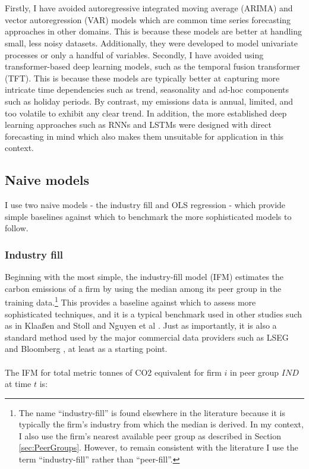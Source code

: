 \documentclass[12pt,twoside]{report}
\begin{document}
\\\\
Firstly, I have avoided autoregressive integrated moving average (ARIMA) and vector autoregression (VAR) models which are common time series forecasting approaches in other domains. This is because these models are better at handling small, less noisy datasets. Additionally, they were developed to model univariate processes or only a handful of variables. Secondly, I have avoided using transformer-based deep learning models, such as the temporal fusion transformer (TFT). This is because these models are typically better at capturing more intricate time dependencies such as trend, seasonality and ad-hoc components such as holiday periods. By contrast, my emissions data is annual, limited, and too volatile to exhibit any clear trend. In addition, the more established deep learning approaches such as RNNs and LSTMs were designed with direct forecasting in mind which also makes them unsuitable for application in this context. 

\subsection{Naive models}

I use two naive models - the industry fill and OLS regression - which provide simple baselines against which to benchmark the more sophisticated models to follow. 

\subsubsection{Industry fill}

Beginning with the most simple, the industry-fill model (IFM) estimates the carbon emissions of a firm by using the median among its peer group in the training data.\footnote{The name ``industry-fill'' is found elsewhere in the literature because it is typically the firm's industry from which the median is derived. In my context, I also use the firm's nearest available peer group as described in Section \ref{sec:PeerGroups}. However, to remain consistent with the literature I use the term ``industry-fill'' rather than ``peer-fill''.} This provides a baseline against which to assess more sophisticated techniques, and it is a typical benchmark used in other studies such as in Klaaßen and Stoll \cite{klassenstoll2021} and Nguyen et al \cite{nguyen2021, Nguyenetal2023}. Just as importantly, it is also a standard method used by the major commercial data providers such as LSEG \cite{ftserussell2024} and Bloomberg \cite{Bloomberg2023}, at least as a starting point.
\\\\
The IFM for total metric tonnes of CO2 equivalent for firm $i$ in peer group $IND$ at time $t$ is:
\end{document}
